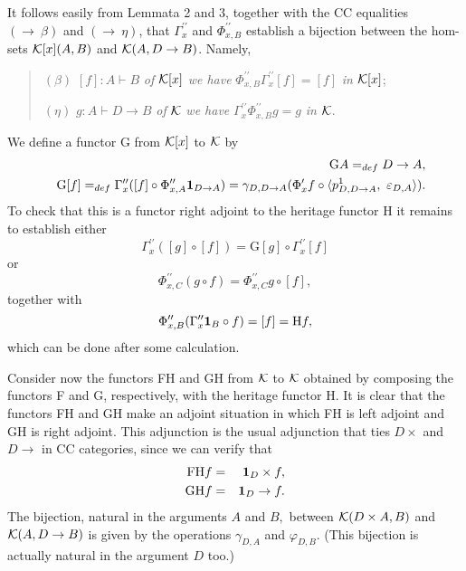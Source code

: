 \documentclass[12pt]{article}
\begin{document}
\noindent It follows easily from Lemmata 2 and 3, together with the CC
equalities $(\rightarrow ~\beta )$ and $(\rightarrow ~\eta )$, that $\Gamma
_{x}^{\prime \prime }$ and $\Phi _{x,B}^{\prime \prime }$ establish a
bijection between the hom-sets ${\cal K}[x](A,B)$ and ${\cal K}%
(A,D\rightarrow B)$. Namely,

\begin{quotation}
\noindent $(\beta )$ $[f]:A\vdash B$ {\it of} ${\cal K}%
[x]$ {\it we have} $\Phi _{x,B}^{\prime \prime }\Gamma _{x}^{\prime \prime
}[f]=[f]$ {\it in} ${\cal K}[x]$;\medskip

\noindent $(\eta )$ $g:A\vdash D\rightarrow B$ {\it of} 
${\cal K}$ {\it we have} $\Gamma _{x}^{\prime \prime }\Phi _{x,B}^{\prime
\prime }g=g$ {\it in} ${\cal K}$.
\end{quotation}

We define a functor G from ${\cal K}[x]$ to ${\cal K}$ by 
\begin{eqnarray*}
&&\text{G}A=_{def}D\rightarrow A, \\
&&\text{G}[f]=_{def}\Gamma _{x}^{\prime \prime }([f]\circ \Phi
_{x,A}^{\prime \prime }{\bf 1}_{D\rightarrow A})=\gamma _{D,D\rightarrow
A}(\Phi _{x}^{\prime }f\circ \langle p_{D,D\rightarrow A}^{1},~\varepsilon
_{D,A}\rangle ).
\end{eqnarray*}
To check that this is a functor right adjoint to the heritage functor H it
remains to establish either 
\[
\Gamma _{x}^{\prime \prime }([g]\circ [f])=\text{G}[g]\circ \Gamma
_{x}^{\prime \prime }[f] 
\]
or 
\[
\Phi _{x,C}^{\prime \prime }(g\circ f)=\Phi _{x,C}^{\prime \prime }g\circ
[f], 
\]
together with 
\[
\Phi _{x,B}^{\prime \prime }(\Gamma _{x}^{\prime \prime }{\bf 1}_{B}\circ
f)=[f]=\text{H}f, 
\]
which can be done after some calculation.

Consider now the functors FH and GH from ${\cal K}$ to ${\cal K}$ obtained
by composing the functors F and G, respectively, with the heritage functor
H. It is clear that the functors FH and GH make an adjoint situation in
which FH is left adjoint and GH is right adjoint. This adjunction is the
usual adjunction that ties $D\times $ and $D\rightarrow $ in CC categories,
since we can verify that 
\begin{eqnarray*}
\text{FH}f &=&{\bf 1}_{D}\times f, \\
\text{GH}f &=&{\bf 1}_{D}\rightarrow f.
\end{eqnarray*}
The bijection, natural in the arguments $A$ and $B,$ between ${\cal K}%
(D\times A,B)$ and ${\cal K}(A,D\rightarrow B)$ is given by the operations $%
\gamma _{D,A}$ and $\varphi _{D,B}$. (This bijection is actually natural in
the argument $D$ too.)
\end{document}
